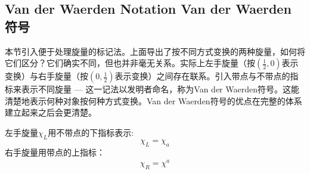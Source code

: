 \subsection[Van der Waerden 符号]{Van der Waerden Notation \quad Van der Waerden 符号}
\label{sec3.7.7}
本节引入便于处理旋量的标记法。上面导出了按不同方式变换的两种旋量，如何将它们区分？它们确实不同，但也并非毫无关系。实际上左手旋量（按$(\frac{1}{2}, 0)$表示变换）与右手旋量（按$(0, \frac{1}{2})$表示变换）之间存在联系。引入带点与不带点的指标来表示不同旋量 --- 这一记法以发明者命名，称为Van der Waerden符号。这能清楚地表示何种对象按何种方式变换。Van der Waerden符号的优点在完整的体系建立起来之后会更清楚。

左手旋量$\chi_L$用不带点的下指标表示:
\begin{equation}
\label{equ3.188}
	\chi_L = \chi_a
\end{equation}
右手旋量用带点的上指标：
\begin{equation}
\label{equ3.189}
	\chi_R = \chi^{\dot{a}}
\end{equation}

